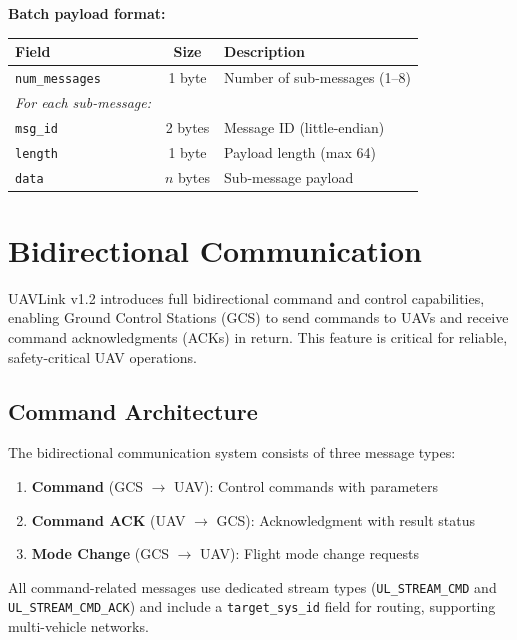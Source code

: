 \documentclass[11pt,a4paper]{article}
\begin{document}
\textbf{Batch payload format:}
\begin{table}[H]
\centering
\begin{tabular}{@{}lcl@{}}
\toprule
\textbf{Field} & \textbf{Size} & \textbf{Description} \\
\midrule
\texttt{num\_messages} & 1 byte & Number of sub-messages (1--8) \\
\emph{For each sub-message:} & & \\
\quad \texttt{msg\_id}  & 2 bytes & Message ID (little-endian) \\
\quad \texttt{length}   & 1 byte  & Payload length (max 64) \\
\quad \texttt{data}     & $n$ bytes & Sub-message payload \\
\bottomrule
\end{tabular}
\end{table}

\section{Bidirectional Communication}

UAVLink v1.2 introduces full bidirectional command and control capabilities, enabling Ground Control Stations (GCS) to send commands to UAVs and receive command acknowledgments (ACKs) in return. This feature is critical for reliable, safety-critical UAV operations.

\subsection{Command Architecture}

The bidirectional communication system consists of three message types:

\begin{enumerate}[noitemsep]
    \item \textbf{Command} (GCS $\to$ UAV): Control commands with parameters
    \item \textbf{Command ACK} (UAV $\to$ GCS): Acknowledgment with result status
    \item \textbf{Mode Change} (GCS $\to$ UAV): Flight mode change requests
\end{enumerate}

All command-related messages use dedicated stream types (\texttt{UL\_STREAM\_CMD} and \texttt{UL\_STREAM\_CMD\_ACK}) and include a \texttt{target\_sys\_id} field for routing, supporting multi-vehicle networks.
\end{document}
